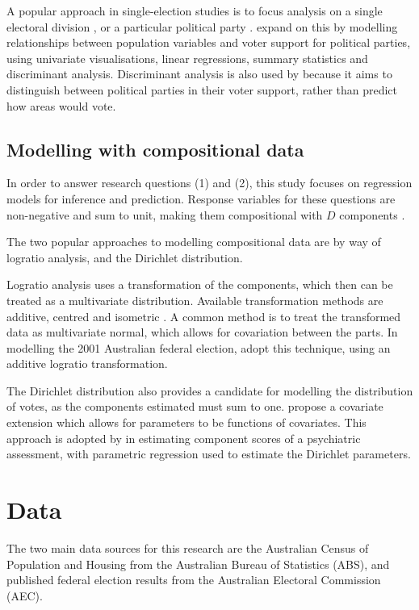 \documentclass{monashthesis}
\theoremstyle{definition}
\theoremstyle{definition}
\theoremstyle{definition}
\theoremstyle{remark}
\begin{document}
A popular approach in single-election studies is to focus analysis on a
single electoral division \autocite{Forrest01}, or a particular
political party \autocite{Davis98}. \textcite{Stim12} expand on this by
modelling relationships between population variables and voter support
for political parties, using univariate visualisations, linear
regressions, summary statistics and discriminant analysis. Discriminant
analysis is also used by \textcite{Stim06} because it aims to
distinguish between political parties in their voter support, rather
than predict how areas would vote.

\section{Modelling with compositional
data}\label{modelling-with-compositional-data}

In order to answer research questions (1) and (2), this study focuses on
regression models for inference and prediction. Response variables for
these questions are non-negative and sum to unit, making them
compositional with \(D\) components \autocite{PG11}.

The two popular approaches to modelling compositional data are by way of
logratio analysis, and the Dirichlet distribution.

Logratio analysis \autocite{JA86} uses a transformation of the
components, which then can be treated as a multivariate distribution.
Available transformation methods are additive, centred and isometric
\autocite{Ego03}. A common method is to treat the transformed data as
multivariate normal, which allows for covariation between the parts. In
modelling the 2001 Australian federal election, \textcite{Chong05} adopt
this technique, using an additive logratio transformation.

The Dirichlet distribution also provides a candidate for modelling the
distribution of votes, as the components estimated must sum to one.
\textcite{Campbell87} propose a covariate extension which allows for
parameters to be functions of covariates. This approach is adopted by
\textcite{Gueor08} in estimating component scores of a psychiatric
assessment, with parametric regression used to estimate the Dirichlet
parameters.

\chapter{Data}\label{ch:Data}

The two main data sources for this research are the Australian Census of
Population and Housing from the Australian Bureau of Statistics (ABS),
and published federal election results from the Australian Electoral
Commission (AEC).
\end{document}
